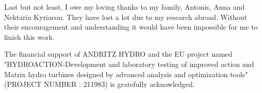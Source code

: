 \begin{acknowledgements}
Last but not least, I owe my loving thanks to my family, Antonis, Anna and Nektaria Kyriacou. They have lost a lot due to my research abroad. Without their encouragement and understanding it would have been impossible for me to finish this work. 

The financial support of ANDRITZ HYDRO and the EU project named "HYDROACTION-Development and laboratory testing of improved action and Matrix hydro turbines designed by advanced analysis and optimization tools" (PROJECT NUMBER : 211983) is gratefully acknowledged.

\end{acknowledgements}



